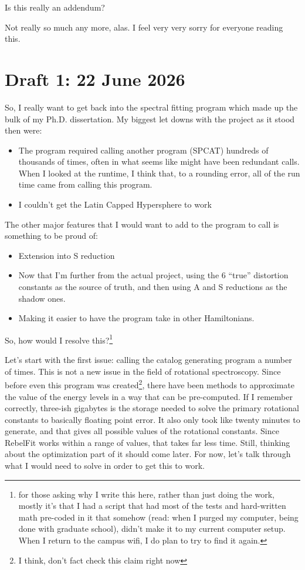 \documentclass[12pt]{article}
\newcommand{\say}[1]{``#1''}
\renewcommand{\,}{\textsuperscript{,}}
\begin{document}
Is this really an addendum?

Not really so much any more, alas.  
I feel very very sorry for everyone reading this.

\section{Draft 1: 22 June 2026}

So, I really want to get back into the spectral fitting program which made up the bulk of my Ph.D. dissertation.  
My biggest let downs with the project as it stood then were:  
\begin{itemize}  
\item The program required calling another program (SPCAT) hundreds of thousands of times, often in what seems like might have been redundant calls. When I looked at the runtime, I think that, to a rounding error, all of the run time came from calling this program.  
\item I couldn't get the Latin Capped Hypersphere to work  
\end{itemize}

The other major features that I would want to add to the program to call is something to be proud of:  
\begin{itemize}  
\item Extension into S reduction  
\item Now that I'm further from the actual project, using the 6 \say{true} distortion constants as the source of truth, and then using A and S reductions as the shadow ones.  
\item Making it easier to have the program take in other Hamiltonians.  
\end{itemize}

So, how would I resolve this?\footnote{for those asking why I write this here, rather than just doing the work, mostly it's that I had a script that had most of the tests and hard-written math pre-coded in it that somehow (read: when I purged my computer, being done with graduate school), didn't make it to my current computer setup.  
When I return to the campus wifi, I do plan to try to find it again.}

Let's start with the first issue: calling the catalog generating program a number of times.  
This is not a new issue in the field of rotational spectroscopy.  
Since before even this program was created\footnote{I think, don't fact check this claim right now}, there have been methods to approximate the value of the energy levels in a way that can be pre-computed.  
If I remember correctly, three-ish gigabytes is the storage needed to solve the primary rotational constants to basically floating point error.  
It also only took like twenty minutes to generate, and that gives all possible values of the rotational constants.  
Since RebelFit works within a range of values, that takes far less time.  
Still, thinking about the optimization part of it should come later.  
For now, let's talk through what I would need to solve in order to get this to work.
\end{document}
